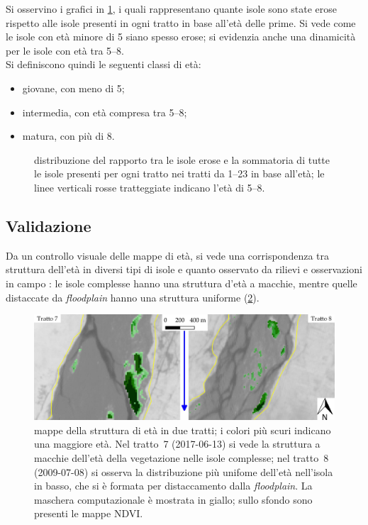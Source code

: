 \medskip
Si osservino i grafici in \cref{graph:distrib-rapp-eros-eta}, i quali rappresentano quante isole sono state erose rispetto alle isole presenti in ogni tratto in base all'età delle prime.
Si vede come le isole con età minore di \SI{5}{\anni} siano spesso erose; si evidenzia anche una dinamicità per le isole con età tra \SIrange[range-phrase={ e }]{5}{8}{\anni}. 
\\
Si definiscono quindi le seguenti classi di età:
%
\begin{itemize}
	\item giovane, con meno di \SI{5}{\anni};
	\item intermedia, con età compresa tra \SIrange[range-phrase={ e }]{5}{8}{\anni};
	\item matura, con più di \SI{8}{\anni}.
\end{itemize}
%
\begin{figure}
	\centering
	
	\caption[distribuzione del rapporto tra isole erose e la somma delle isole presenti]{distribuzione del rapporto tra le isole erose e la sommatoria di tutte le isole presenti per ogni tratto nei tratti da \numrange[range-phrase={ a }, mode=text]{1}{23} in base all'età; le linee verticali rosse tratteggiate indicano l'età di \SIrange[range-phrase={ e }]{5}{8}{\anni}.}
	\label{graph:distrib-rapp-eros-eta}
\end{figure}

\subsection{Validazione}
Da un controllo visuale delle mappe di età, si vede una corrispondenza tra struttura dell'età in diversi tipi di isole e quanto osservato da rilievi e osservazioni in campo : le isole complesse hanno una struttura d'età a macchie, mentre quelle distaccate da \emph{floodplain} hanno una struttura uniforme (\cref{fig:struttura-eta}).
%
\begin{figure}
	\centering
	\includegraphics[width = \textwidth]{files/struttura_eta.jpeg}
	\caption[mappe della struttura di età in due tratti]{mappe della struttura di età in due tratti; i colori più scuri indicano una maggiore età.
		Nel tratto~7 (2017-06-13) si vede la struttura a macchie dell'età della vegetazione nelle isole complesse;
		nel tratto~8 (2009-07-08) si osserva la distribuzione più unifome dell'età nell'isola in basso, che si è formata per distaccamento dalla \emph{floodplain}.
		La maschera computazionale è mostrata in giallo; sullo sfondo sono presenti le mappe NDVI.}
	\label{fig:struttura-eta}
\end{figure}
%


